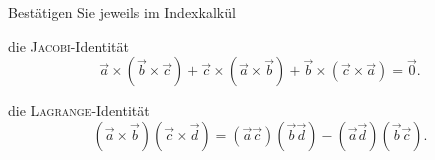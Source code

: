 \begin{atiTask}[
  title = Die Identitäten von JACOBI und LAGRANGE
]
Bestätigen Sie jeweils im Indexkalkül 
\begin{atiSubtasks}
\item die \textsc{Jacobi}-Identität
\[\vec{a}\times (\vec{b}\times \vec{c})+\vec{c}\times (\vec{a}\times \vec{b})+\vec{b}\times (\vec{c}\times \vec{a})=\vec{0}.
\]
\item die \textsc{Lagrange}-Identität
\[(\vec{a}\times \vec{b})(\vec{c}\times \vec{d})=(\vec{a}\vec{c})(\vec{b}\vec{d})-(\vec{a}\vec{d})(\vec{b}\vec{c}).
\]
\end{atiSubtasks}



\end{atiTask}

\begin{atiSolution}
	
\end{atiSolution}